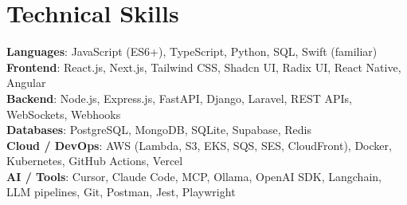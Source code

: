 \documentclass[letterpaper,11pt]{article}
\begin{document}
%
\section{Technical Skills}
 \begin{itemize}[leftmargin=0.15in, label={}]
    \small{\item{
     \textbf{Languages}{: JavaScript (ES6+), TypeScript, Python, SQL, Swift (familiar)} \\
     \textbf{Frontend}{: React.js, Next.js, Tailwind CSS, Shadcn UI, Radix UI, React Native, Angular} \\
     \textbf{Backend}{: Node.js, Express.js, FastAPI, Django, Laravel, REST APIs, WebSockets, Webhooks} \\
     \textbf{Databases}{: PostgreSQL, MongoDB, SQLite, Supabase, Redis} \\
     \textbf{Cloud / DevOps}{: AWS (Lambda, S3, EKS, SQS, SES, CloudFront), Docker, Kubernetes, GitHub Actions, Vercel} \\
     \textbf{AI / Tools}{: Cursor, Claude Code, MCP, Ollama, OpenAI SDK, Langchain, LLM pipelines, Git, Postman, Jest, Playwright}
    }}
 \end{itemize}


\end{document}
